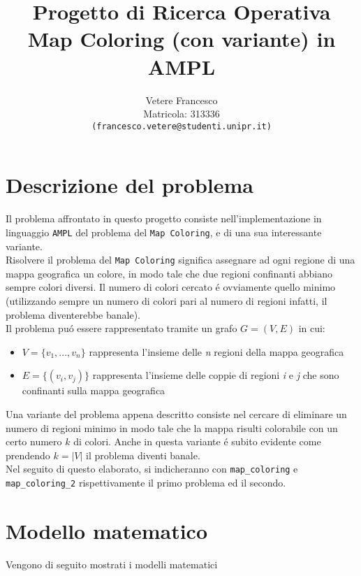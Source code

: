 \documentclass{article}
\title{\textbf{Progetto di Ricerca Operativa} \\
	\large \textbf{Map Coloring (con variante) in AMPL} \\
}
\author{Vetere Francesco\\ Matricola: 313336 \\ \texttt{(francesco.vetere@studenti.unipr.it)}}
\date{}
\begin{document}
\maketitle
\tableofcontents

\pagebreak

\section{Descrizione del problema} 

Il problema affrontato in questo progetto consiste nell'implementazione in linguaggio \texttt{AMPL} del problema del \texttt{Map Coloring}, e di una sua interessante variante.\\
Risolvere il problema del \texttt{Map Coloring} significa assegnare ad ogni regione di una mappa geografica un colore, in modo tale che due regioni confinanti abbiano sempre colori diversi. Il numero di colori cercato \'e ovviamente quello minimo (utilizzando sempre un numero di colori pari al numero di regioni infatti, il problema diventerebbe banale).\\
Il problema pu\'o essere rappresentato tramite un grafo $G = (V, E)$ in cui:
\begin{itemize}
\item $V=\{v_{1},...,v_{n}\}$ rappresenta l'insieme delle \emph{n} regioni della mappa geografica
\item $E=\{(v_{i}, v_{j})\}$ rappresenta l'insieme delle coppie di regioni \emph{i} e \emph{j} che sono confinanti sulla mappa geografica\\
\end{itemize}

Una variante del problema appena descritto consiste nel cercare di eliminare un numero di regioni minimo in modo tale che la mappa risulti colorabile con un certo numero $k$ di colori. Anche in questa variante \'e subito evidente come prendendo $k = |V|$ il problema diventi banale.\\

Nel seguito di questo elaborato, si indicheranno con \texttt{map\_coloring} e \texttt{map\_coloring\_2} rispettivamente il primo problema ed il secondo.
\pagebreak

\section{Modello matematico}
Vengono di seguito mostrati i modelli matematici\\
\end{document}

